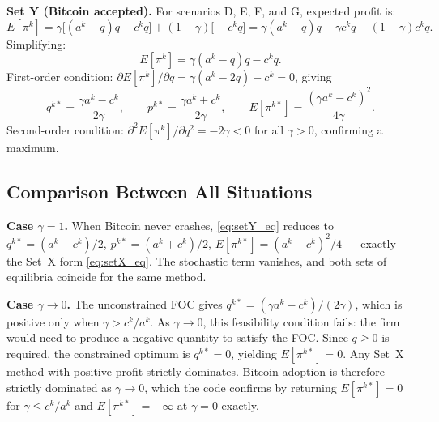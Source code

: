 \documentclass{article}
\begin{document}
\textbf{Set Y (Bitcoin accepted).}
For scenarios D, E, F, and G, expected profit is:
\begin{equation}
  E[\pi^k] = \gamma \bigl[(a^k - q)q - c^k q\bigr]
           + (1-\gamma)\bigl[-c^k q\bigr]
           = \gamma(a^k - q)q - \gamma c^k q - (1-\gamma)c^k q.
  \label{eq:setY_profit_raw}
\end{equation}
Simplifying:
\begin{equation}
  E[\pi^k] = \gamma(a^k - q)q - c^k q.
  \label{eq:setY_profit}
\end{equation}
First-order condition: $\partial E[\pi^k] / \partial q = \gamma(a^k - 2q) - c^k = 0$,
giving
\begin{equation}
  q^{k*} = \frac{\gamma a^k - c^k}{2\gamma}, \qquad
  p^{k*} = \frac{\gamma a^k + c^k}{2\gamma}, \qquad
  E[\pi^{k*}] = \frac{(\gamma a^k - c^k)^2}{4\gamma}.
  \label{eq:setY_eq}
\end{equation}
Second-order condition: $\partial^2 E[\pi^k] / \partial q^2 = -2\gamma < 0$ for
all $\gamma > 0$, confirming a maximum.

\subsection{Comparison Between All Situations}
\label{sec:comparison}

\textbf{Case $\gamma = 1$.}
When Bitcoin never crashes, \eqref{eq:setY_eq} reduces to
$q^{k*} = (a^k - c^k)/2$, $p^{k*} = (a^k + c^k)/2$,
$E[\pi^{k*}] = (a^k - c^k)^2/4$ --- exactly the Set~X form \eqref{eq:setX_eq}.
The stochastic term vanishes, and both sets of equilibria coincide for the same
method.

\textbf{Case $\gamma \to 0$.}
The unconstrained FOC gives $q^{k*} = (\gamma a^k - c^k)/(2\gamma)$, which is
positive only when $\gamma > c^k/a^k$.
As $\gamma \to 0$, this feasibility condition fails: the firm would need to
produce a negative quantity to satisfy the FOC.
Since $q \geq 0$ is required, the constrained optimum is $q^{k*} = 0$, yielding
$E[\pi^{k*}] = 0$.
Any Set~X method with positive profit strictly dominates.
Bitcoin adoption is therefore strictly dominated as $\gamma \to 0$,
which the code confirms by returning $E[\pi^{k*}] = 0$ for $\gamma \leq c^k/a^k$
and $E[\pi^{k*}] = -\infty$ at $\gamma = 0$ exactly.
\end{document}
